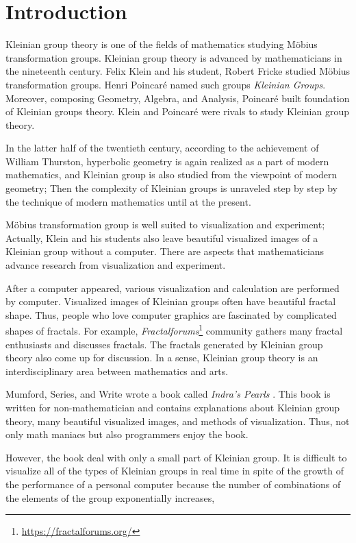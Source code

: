 
\section{Introduction}

Kleinian group theory is one of the fields of mathematics studying 
M\"obius transformation groups.
Kleinian group theory is advanced by mathematicians in the nineteenth
century.
Felix Klein and his student, Robert Fricke studied M\"obius
transformation groups.
Henri Poincar\'e named such groups \textit{Kleinian Groups}.
Moreover, composing Geometry, Algebra, and Analysis,
Poincar\'e built foundation of Kleinian groups theory.
Klein and Poincar\'e were rivals to study Kleinian group theory.

In the latter half of the twentieth century, according to the
achievement of William Thurston, hyperbolic geometry is again realized 
as a part of modern mathematics, and Kleinian group is also studied from
the viewpoint of modern geometry;
Then the complexity of Kleinian groups is unraveled step by step by
the technique of modern mathematics until at the present.

M\"obius transformation group is well suited to visualization and
experiment; Actually, Klein and his students also leave beautiful
visualized images of a Kleinian group without a computer.
There are aspects that mathematicians advance research from
visualization and experiment.

After a computer appeared, various visualization and calculation are
performed by computer.
Visualized images of Kleinian groups often have beautiful fractal shape.
Thus, people who love computer graphics are fascinated by complicated shapes of fractals.
For example,
\textit{Fractalforums}\footnote{\url{https://fractalforums.org/}}
community gathers many fractal enthusiasts and discusses fractals.
The fractals generated by Kleinian group theory also come up for
discussion.
In a sense, Kleinian group theory is an interdisciplinary area between
mathematics and arts.

Mumford, Series, and Write wrote a book called
\textit{Indra's Pearls} \cite{MumfordSeriesWright200204}.
This book is written for non-mathematician and contains explanations
about Kleinian group theory, many beautiful visualized images, and
methods of visualization.
Thus, not only math maniacs but also programmers enjoy the book.

However, the book deal with only a small part of Kleinian group.
It is difficult to visualize all of the types of Kleinian groups in real
time in spite of the growth of the performance of a personal computer
because the number of combinations of the elements of the group
exponentially increases,


